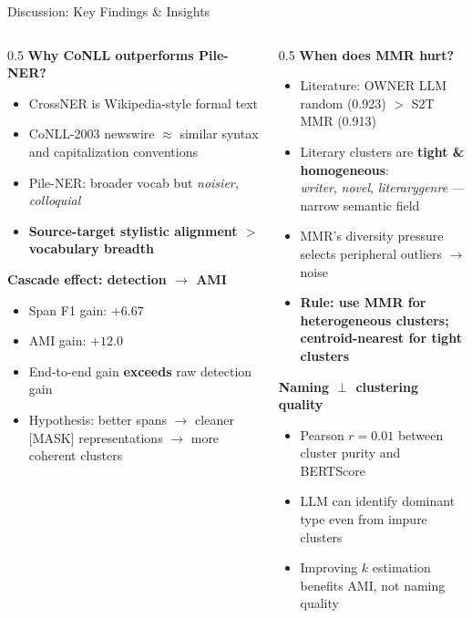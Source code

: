 \documentclass[aspectratio=169,10pt]{beamer}
\newcommand{\hl}[1]{\textcolor{gold!80!black}{\textbf{#1}}}
\begin{document}
\begin{frame}{Discussion: Key Findings \& Insights}
  \begin{columns}[T]
    \begin{column}{0.5\textwidth}
      \textbf{Why CoNLL outperforms Pile-NER?}
      \begin{itemize}
        \item CrossNER is Wikipedia-style formal text
        \item CoNLL-2003 newswire $\approx$ similar syntax and capitalization conventions
        \item Pile-NER: broader vocab but \emph{noisier, colloquial}
        \item \hl{Source-target stylistic alignment $>$ vocabulary breadth}
      \end{itemize}
      \vspace{0.4em}
      \textbf{Cascade effect: detection $\to$ AMI}
      \begin{itemize}
        \item Span F1 gain: $+6.67$
        \item AMI gain: $+12.0$
        \item End-to-end gain \textbf{exceeds} raw detection gain
        \item Hypothesis: better spans $\to$ cleaner [MASK] representations $\to$ more coherent clusters
      \end{itemize}
    \end{column}
    \begin{column}{0.5\textwidth}
      \textbf{When does MMR hurt?}
      \begin{itemize}
        \item Literature: OWNER LLM random (0.923) $>$ S2T MMR (0.913)
        \item Literary clusters are \textbf{tight \& homogeneous}:\\
          \textit{writer}, \textit{novel}, \textit{literarygenre} — narrow semantic field
        \item MMR's diversity pressure selects peripheral outliers $\to$ noise
        \item \hl{Rule: use MMR for heterogeneous clusters;\\centroid-nearest for tight clusters}
      \end{itemize}
      \vspace{0.4em}
      \textbf{Naming $\perp$ clustering quality}
      \begin{itemize}
        \item Pearson $r = 0.01$ between cluster purity and BERTScore
        \item LLM can identify dominant type even from impure clusters
        \item Improving $k$ estimation benefits AMI, not naming quality
      \end{itemize}
    \end{column}
  \end{columns}
\end{frame}
\end{document}
